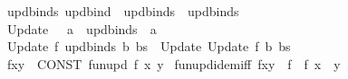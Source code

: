 \begin{isabellebody}
\ \ {\isachardoublequoteopen}{\isacharunderscore}{\kern0pt}updbinds{\isachardoublequoteclose}{\isacharcolon}{\kern0pt}{\isacharcolon}{\kern0pt}\ {\isachardoublequoteopen}updbind\ {\isasymRightarrow}\ updbinds\ {\isasymRightarrow}\ updbinds{\isachardoublequoteclose}\ {\isacharparenleft}{\kern0pt}{\isachardoublequoteopen}{\isacharunderscore}{\kern0pt}{\isacharcomma}{\kern0pt}{\isacharslash}{\kern0pt}\ {\isacharunderscore}{\kern0pt}{\isachardoublequoteclose}{\isacharparenright}{\kern0pt}\isanewline
\ \ {\isachardoublequoteopen}{\isacharunderscore}{\kern0pt}Update{\isachardoublequoteclose}\ \ {\isacharcolon}{\kern0pt}{\isacharcolon}{\kern0pt}\ {\isachardoublequoteopen}{\isacharprime}{\kern0pt}a\ {\isasymRightarrow}\ updbinds\ {\isasymRightarrow}\ {\isacharprime}{\kern0pt}a{\isachardoublequoteclose}\ \ \ \ \ \ \ \ \ \ \ \ {\isacharparenleft}{\kern0pt}{\isachardoublequoteopen}{\isacharunderscore}{\kern0pt}{\isacharslash}{\kern0pt}{\isacharprime}{\kern0pt}{\isacharparenleft}{\kern0pt}{\isacharparenleft}{\kern0pt}{\isacharunderscore}{\kern0pt}{\isacharparenright}{\kern0pt}{\isacharprime}{\kern0pt}{\isacharparenright}{\kern0pt}{\isachardoublequoteclose}\ {\isacharbrackleft}{\kern0pt}{}{}{}{}{\isacharcomma}{\kern0pt}\ {}{\isacharbrackright}{\kern0pt}\ {}{}{}{\isacharparenright}{\kern0pt}\isanewline
\isanewline
{}\isamarkupfalse%
\isanewline
\ \ {\isachardoublequoteopen}{\isacharunderscore}{\kern0pt}Update\ f\ {\isacharparenleft}{\kern0pt}{\isacharunderscore}{\kern0pt}updbinds\ b\ bs{\isacharparenright}{\kern0pt}{\isachardoublequoteclose}\ {\isasymrightleftharpoons}\ {\isachardoublequoteopen}{\isacharunderscore}{\kern0pt}Update\ {\isacharparenleft}{\kern0pt}{\isacharunderscore}{\kern0pt}Update\ f\ b{\isacharparenright}{\kern0pt}\ bs{\isachardoublequoteclose}\isanewline
\ \ {\isachardoublequoteopen}f{\isacharparenleft}{\kern0pt}x{\isacharcolon}{\kern0pt}{\isacharequal}{\kern0pt}y{\isacharparenright}{\kern0pt}{\isachardoublequoteclose}\ {\isasymrightleftharpoons}\ {\isachardoublequoteopen}CONST\ fun{\isacharunderscore}{\kern0pt}upd\ f\ x\ y{\isachardoublequoteclose}\isanewline
\isanewline
\isanewline
\isanewline
{}\isamarkupfalse%
\ fun{\isacharunderscore}{\kern0pt}upd{\isacharunderscore}{\kern0pt}idem{\isacharunderscore}{\kern0pt}iff{\isacharcolon}{\kern0pt}\ {\isachardoublequoteopen}f{\isacharparenleft}{\kern0pt}x{\isacharcolon}{\kern0pt}{\isacharequal}{\kern0pt}y{\isacharparenright}{\kern0pt}\ {\isacharequal}{\kern0pt}\ f\ {\isasymlongleftrightarrow}\ f\ x\ {\isacharequal}{\kern0pt}\ y{\isachardoublequoteclose}\isanewline

\end{isabellebody}
